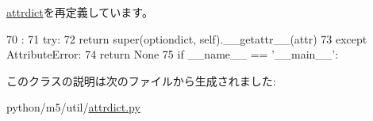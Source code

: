 \hyperlink{classm5_1_1util_1_1attrdict_1_1attrdict_a0a990b3ec3889d40889daca9ee5e4695}{attrdict}を再定義しています。


\begin{DoxyCode}
70                                :
71         try:
72             return super(optiondict, self).__getattr__(attr)
73         except AttributeError:
74             return None
75 
if __name__ == '__main__':
\end{DoxyCode}


このクラスの説明は次のファイルから生成されました:\begin{DoxyCompactItemize}
\item 
python/m5/util/\hyperlink{attrdict_8py}{attrdict.py}\end{DoxyCompactItemize}
